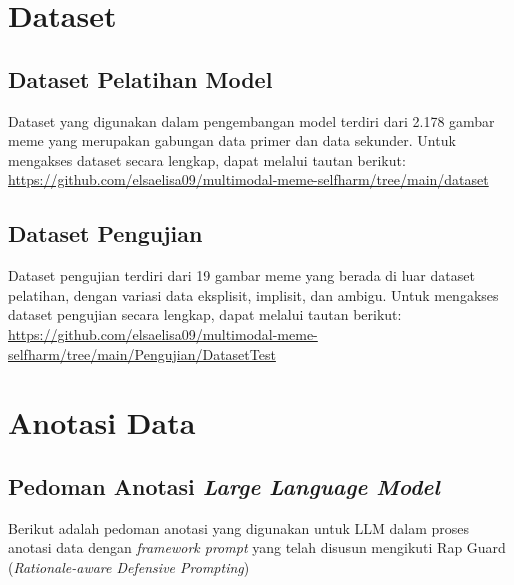 


\section{Dataset}
\subsection{Dataset Pelatihan Model}
Dataset yang digunakan dalam pengembangan model terdiri dari 2.178 gambar meme yang merupakan gabungan data 	primer dan data sekunder. Untuk mengakses dataset secara lengkap, dapat melalui tautan berikut: \href{https://github.com/elsaelisa09/multimodal-meme-selfharm/tree/main/dataset}{https://github.com/elsaelisa09/multimodal-meme-selfharm/tree/main/dataset}

\subsection{Dataset Pengujian}
Dataset pengujian terdiri dari 19 gambar meme yang berada di luar dataset pelatihan, dengan variasi data eksplisit, implisit, dan ambigu. Untuk mengakses dataset pengujian secara lengkap, dapat melalui tautan berikut: \href{https://github.com/elsaelisa09/multimodal-meme-selfharm/tree/main/Pengujian/Dataset%20Test}{https://github.com/elsaelisa09/multimodal-meme-selfharm/tree/main/Pengujian/DatasetTest}

\section{Anotasi Data}
\subsection{Pedoman Anotasi \textit{Large Language Model}}
Berikut adalah pedoman anotasi yang digunakan untuk LLM dalam proses anotasi data dengan \textit{framework prompt} yang telah disusun mengikuti Rap Guard (\textit{Rationale-aware Defensive Prompting})
\vspace{0.5cm}


